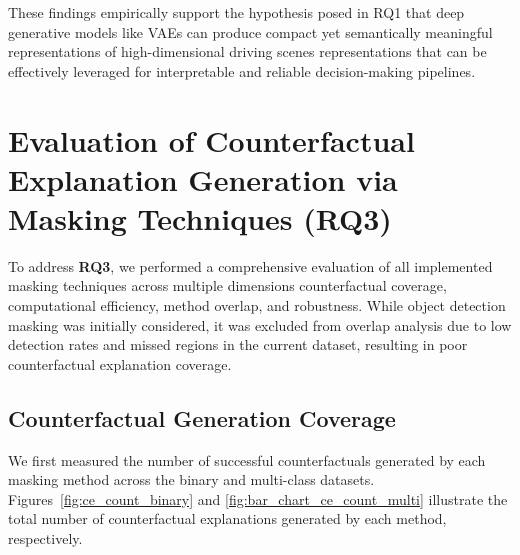 These findings empirically support the hypothesis posed in RQ1 that deep generative models like VAEs can produce compact yet semantically meaningful representations of high-dimensional driving scenes representations that can be effectively leveraged for interpretable and reliable decision-making pipelines.









\section{Evaluation of Counterfactual Explanation Generation via Masking Techniques (RQ3)} \label{sec:masking_eval}
To address \textbf{RQ3}, we performed a comprehensive evaluation of all implemented masking techniques across multiple dimensions counterfactual coverage, computational efficiency, method overlap, and robustness. While object detection masking was initially considered, it was excluded from overlap analysis due to low detection rates and missed regions in the current dataset, resulting in poor counterfactual explanation coverage.

\subsection{Counterfactual Generation Coverage}
We first measured the number of successful counterfactuals generated by each masking method across the binary and multi-class datasets. Figures~\ref{fig:ce_count_binary} and \ref{fig:bar_chart_ce_count_multi} illustrate the total number of counterfactual explanations generated by each method, respectively.

